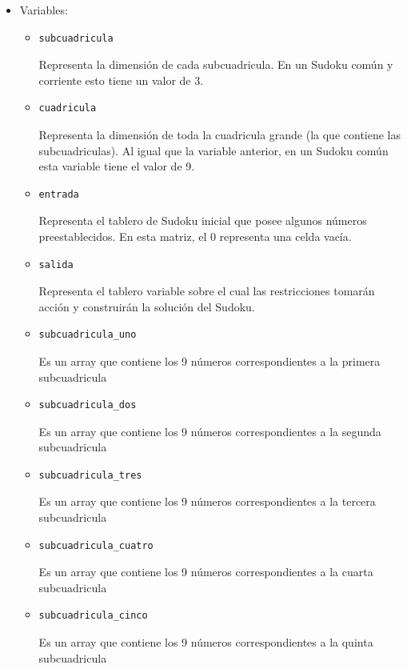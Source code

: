 \documentclass[12pt]{article}
\begin{document}
\begin{itemize}
\item Variables:
\begin{itemize}
\item \begin{verbatim}
subcuadricula
\end{verbatim} Representa la dimensión de cada subcuadricula. En un Sudoku común y corriente esto tiene un valor de 3. 
\item \begin{verbatim}
cuadricula
\end{verbatim} Representa la dimensión de toda la cuadricula grande (la que contiene las subcuadriculas). Al igual que la variable anterior, en un Sudoku común esta variable tiene el valor de 9.  
\item \begin{verbatim}
entrada
\end{verbatim} Representa el tablero de Sudoku inicial que posee algunos números preestablecidos. En esta matriz, el 0 representa una celda vacía.  
\item \begin{verbatim}
salida
\end{verbatim} Representa el tablero variable sobre el cual las restricciones tomarán acción y construirán la solución del Sudoku.
\item \begin{verbatim}
subcuadricula_uno
\end{verbatim} Es un array que contiene los 9 números correspondientes a la primera subcuadricula
\item \begin{verbatim}
subcuadricula_dos
\end{verbatim} Es un array que contiene los 9 números correspondientes a la segunda subcuadricula
\item \begin{verbatim}
subcuadricula_tres
\end{verbatim} Es un array que contiene los 9 números correspondientes a la tercera subcuadricula
\item \begin{verbatim}
subcuadricula_cuatro
\end{verbatim} Es un array que contiene los 9 números correspondientes a la cuarta subcuadricula
\item \begin{verbatim}
subcuadricula_cinco
\end{verbatim} Es un array que contiene los 9 números correspondientes a la quinta subcuadricula

\end{itemize}
\end{itemize}
\end{document}

